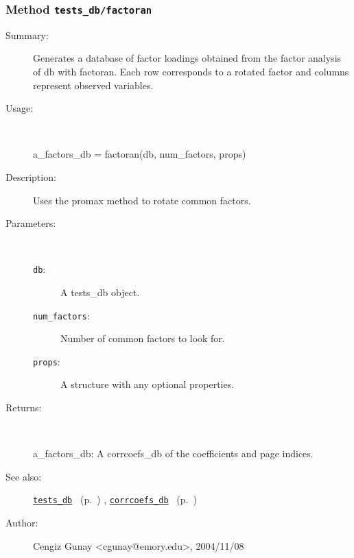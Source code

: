 \subsubsection[Method \texttt{factoran}]{Method \texttt{tests\_db/factoran}}%
%
\label{ref_tests_db__factoran}%
\hypertarget{ref_tests_db__factoran}{}%
\begin{description}
\item[Summary:]Generates a database of factor loadings obtained from the 
		factor analysis of db with factoran. Each row corresponds
		to a rotated factor and columns represent observed variables.
%
\item[Usage:]~%
\begin{lyxcode}%
a\_factors\_db = factoran(db, num\_factors, props)
%
\end{lyxcode}%
%
\item[Description:]%
Uses the promax method to rotate common factors.
\item[Parameters:]~
\begin{description}%
\item[\texttt{db}:]
 A tests\_db object.
\item[\texttt{num\_factors}:]
 Number of common factors to look for.
\item[\texttt{props}:]
 A structure with any optional properties.
\end{description}%
%
\item[Returns:
]~

	a\_factors\_db: A corrcoefs\_db of the coefficients and page indices.
%
%
\item[See also:]%
\hyperlink{ref_tests_db}{\texttt{tests\_db}}%
\ (p.~\pageref{ref_tests_db})%
%
, \hyperlink{ref_corrcoefs_db}{\texttt{corrcoefs\_db}}%
\ (p.~\pageref{ref_corrcoefs_db})%
%
%
\item[Author:]%
Cengiz Gunay <cgunay@emory.edu>, 2004/11/08
%
\end{description}
\methodline%
